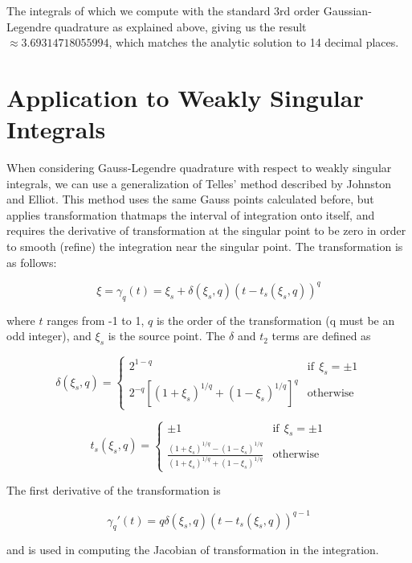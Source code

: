 The integrals of which we compute with the standard 3rd order Gaussian-Legendre quadrature as explained above, giving us the result $\approx 3.69314718055994$, which matches the analytic solution to 14 decimal places.


\section{Application to Weakly Singular Integrals}
When considering Gauss-Legendre quadrature with respect to weakly singular integrals, we can use a generalization of Telles' method\cite{Telles1987A-self-adaptive} described by Johnston and Elliot.\cite{Johnston2001A-generalisatio} This method uses the same Gauss points calculated before, but applies transformation thatmaps the interval of integration onto itself, and requires the derivative of transformation at the singular point to be zero in order to smooth (refine) the integration near the singular point.  The transformation is as follows:

\begin{equation}
\xi = \gamma_q(t) = \xi_s + \delta(\xi_s,q)(t-t_s(\xi_s,q))^q
\end{equation}

where $t$ ranges from -1 to 1, $q$ is the order of the transformation (q must be an odd integer), and $\xi_s$ is the source point. The $\delta$ and $t_2$ terms are defined as

\begin{equation}
\delta(\xi_s,q) = 
\begin{cases}
2^{1-q} & \mathrm{if}~~\xi_s = \pm 1\\
2^{-q}\left[ (1+\xi_s)^{1/q} + (1-\xi_s)^{1/q} \right]^q & \mathrm{otherwise}
\end{cases}
\end{equation}


\begin{equation}
t_s(\xi_s,q) = 
\begin{cases}
\pm 1 & \mathrm{if}~~\xi_s = \pm 1\\
\frac{ (1+\xi_s)^{1/q} - (1-\xi_s)^{1/q} }{ (1+\xi_s)^{1/q} + (1-\xi_s)^{1/q} } & \mathrm{otherwise}
\end{cases}
\end{equation}

The first derivative of the transformation is

\begin{equation}
\gamma_q'(t) = q\delta(\xi_s,q)(t-t_s(\xi_s,q))^{q-1}
\end{equation}

and is used in computing the Jacobian of transformation in the integration.




\bigskip

 
{}

 
